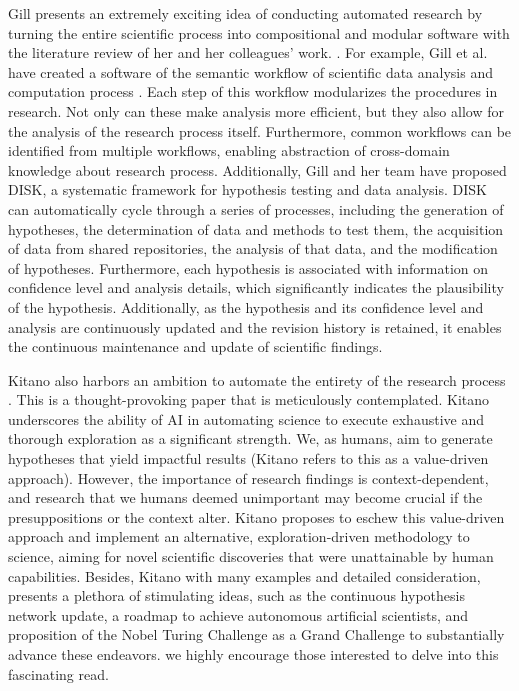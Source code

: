 \documentclass{book}
\begin{document}
Gill presents an extremely exciting idea of conducting automated research by turning the entire scientific process into compositional and modular software with the literature review of her and her colleagues' work. \cite{gil2022will}. For example, Gill et al. have created a software of the semantic workflow of scientific data analysis and computation process  \cite{gil2011semantic}. 
Each step of this workflow modularizes the procedures in research. Not only can these make analysis more efficient, but they also allow for the analysis of the research process itself. Furthermore, common workflows can be identified from multiple workflows, enabling abstraction of cross-domain knowledge about research process. Additionally, Gill and her team have proposed DISK, a systematic framework for hypothesis testing and data analysis. DISK can automatically cycle through a series of processes, including the generation of hypotheses, the determination of data and methods to test them, the acquisition of data from shared repositories, the analysis of that data, and the modification of hypotheses. Furthermore, each hypothesis is associated with information on confidence level and analysis details, which significantly indicates the plausibility of the hypothesis. Additionally, as the hypothesis and its confidence level and analysis are continuously updated and the revision history is retained, it enables the continuous maintenance and update of scientific findings.

Kitano also harbors an ambition to automate the entirety of the research process \cite{kitano2021nobel}. This is a thought-provoking paper that is meticulously contemplated. Kitano underscores the ability of AI in automating science to execute exhaustive and thorough exploration as a significant strength. We, as humans, aim to generate hypotheses that yield impactful results (Kitano refers to this as a value-driven approach). However, the importance of research findings is context-dependent, and research that we humans deemed unimportant may become crucial if the presuppositions or the context alter. Kitano proposes to eschew this value-driven approach and implement an alternative, exploration-driven methodology to science, aiming for novel scientific discoveries that were unattainable by human capabilities. Besides, Kitano with many examples and detailed consideration, presents a plethora of stimulating ideas, such as the continuous hypothesis network update, a roadmap to achieve autonomous artificial scientists, and proposition of the Nobel Turing Challenge as a Grand Challenge to substantially advance these endeavors. we highly encourage those interested to delve into this fascinating read.
\end{document}
